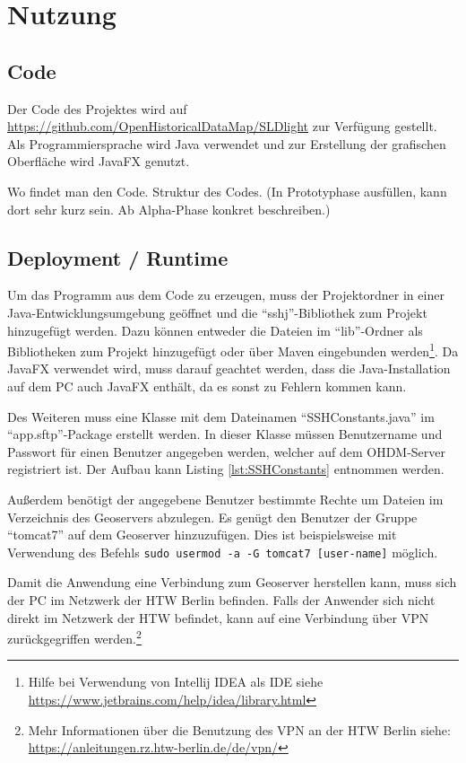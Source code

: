 \section{Nutzung}\label{Nutzung}
\subsection{Code}
Der Code des Projektes wird auf \url{https://github.com/OpenHistoricalDataMap/SLDlight} zur Verfügung gestellt.
Als Programmiersprache wird Java verwendet und zur Erstellung der grafischen Oberfläche wird JavaFX genutzt.

Wo findet man den Code. Struktur des Codes. (In Prototyphase ausfüllen,
kann dort sehr kurz sein. Ab Alpha-Phase konkret beschreiben.)

\subsection{Deployment / Runtime}\label{Deployment}
Um das Programm aus dem Code zu erzeugen, muss der Projektordner in einer Java-Entwicklungsumgebung geöffnet und die \enquote{sshj}-Bibliothek zum Projekt hinzugefügt werden. Dazu können entweder die Dateien im \enquote{lib}-Ordner als Bibliotheken zum Projekt hinzugefügt oder über Maven eingebunden werden\footnote{Hilfe bei Verwendung von Intellij IDEA als IDE siehe \url{https://www.jetbrains.com/help/idea/library.html}}. Da JavaFX verwendet wird, muss darauf geachtet werden, dass die Java-Installation auf dem PC auch JavaFX enthält, da es sonst zu Fehlern kommen kann.

Des Weiteren muss eine Klasse mit dem Dateinamen \enquote{SSHConstants.java} im \enquote{app.sftp}-Package erstellt werden. In dieser Klasse müssen Benutzername und Passwort für einen Benutzer angegeben werden, welcher auf dem OHDM-Server registriert ist. Der Aufbau kann Listing \ref{lst:SSHConstants} entnommen werden. 

Außerdem benötigt der angegebene Benutzer bestimmte Rechte um Dateien im Verzeichnis des Geoservers abzulegen. Es genügt den Benutzer der Gruppe \enquote{tomcat7} auf dem Geoserver hinzuzufügen. Dies ist beispielsweise mit Verwendung des Befehls \lstinline[]{sudo usermod -a -G tomcat7 [user-name]} möglich.

Damit die Anwendung eine Verbindung zum Geoserver herstellen kann, muss sich der PC im Netzwerk der HTW Berlin befinden. Falls der Anwender sich nicht direkt im Netzwerk der HTW befindet, kann auf eine Verbindung über VPN zurückgegriffen werden.\footnote{Mehr Informationen über die Benutzung des VPN an der HTW Berlin siehe: \url{https://anleitungen.rz.htw-berlin.de/de/vpn/}}

